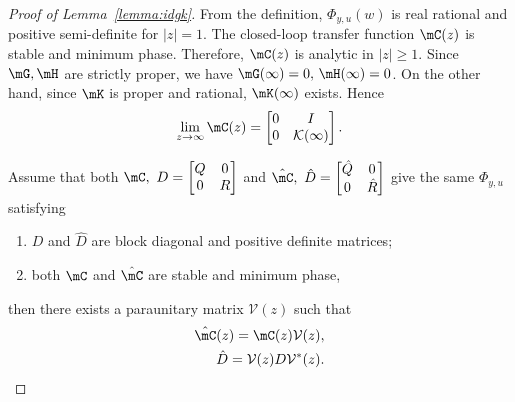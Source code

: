 \appendix
\begin{proof}[Proof of Lemma~\ref{lemma:idgk}]
  From the definition, $\Phi_{y,u}(w)$ is real rational and positive semi-definite for $|z|=1$. The closed-loop transfer function $\mC(z)$ is stable and minimum phase. Therefore, $\mC(z)$ is analytic in $|z|\ge 1$. Since $\mG, \mH$ are strictly proper, we have $\mG(\infty) = 0,\,\mH(\infty)=0$. On the other hand, since $\mK$ is proper and rational, $\mK(\infty)$ exists. Hence
  \begin{align*}
    \lim_{z\rightarrow\infty} \mC(z)= \begin{bmatrix} 
      0 & I \\
      0 & \mathcal K(\infty)
    \end{bmatrix}.
  \end{align*}

  Assume that both $\mC,~D=\begin{bmatrix}
    Q & 0 \\ 
    0 & R
  \end{bmatrix}$ and $\hat \mC,~\hat D=\begin{bmatrix}
    \hat Q & 0 \\
    0 & \hat R
  \end{bmatrix}$ give the same $\Phi_{y,u}$ satisfying 
  \begin{enumerate}
  \item $D$ and $\hat D$ are block diagonal and positive definite matrices; \item both $\mC$ and $\hat \mC$ are stable and minimum phase,
  \end{enumerate}
  then there exists a paraunitary matrix $\mathcal V(z)$ such that \cite{anderson3}
  \begin{align}
    \hat \mC(z)=\mC(z)\mathcal V(z),\label{eq:c1c2}\\
    \hat D= \mathcal V(z) D\mathcal V^*(z).\label{eq:q1q2}
  \end{align}


\end{proof}
